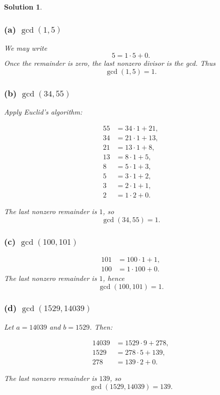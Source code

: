 \documentclass[11pt]{article}
\newtheorem*{solution}{Solution}
\begin{document}
\begin{solution}

\subsubsection*{(a) $\gcd(1,5)$}
We may write
\[
5 = 1 \cdot 5 + 0.
\]
Once the remainder is zero, the last nonzero divisor is the gcd. Thus
\[
\gcd(1,5) = 1.
\]

\subsubsection*{(b) $\gcd(34,55)$}

Apply Euclid's algorithm:

\begin{align*}
55 &= 34\cdot 1 + 21,\\
34 &= 21\cdot 1 + 13,\\
21 &= 13\cdot 1 + 8,\\
13 &= 8\cdot 1 + 5,\\
8 &= 5\cdot 1 + 3,\\
5 &= 3\cdot 1 + 2,\\
3 &= 2\cdot 1 + 1,\\
2 &= 1\cdot 2 + 0.
\end{align*}

The last nonzero remainder is $1$, so
\[
\gcd(34,55) = 1.
\]

\subsubsection*{(c) $\gcd(100,101)$}

\begin{align*}
101 &= 100\cdot 1 + 1,\\
100 &= 1\cdot 100 + 0.
\end{align*}
The last nonzero remainder is $1$, hence
\[
\gcd(100,101) = 1.
\]

\subsubsection*{(d) $\gcd(1529,14039)$}

Let $a=14039$ and $b=1529$. Then:

\begin{align*}
14039 &= 1529 \cdot 9 + 278,\\
1529 &= 278 \cdot 5 + 139,\\
278 &= 139 \cdot 2 + 0.
\end{align*}

The last nonzero remainder is $139$, so
\[
\gcd(1529,14039) = 139.
\]
\end{solution}
\end{document}
